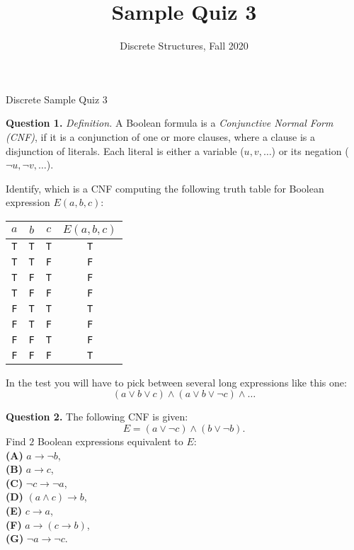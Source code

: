 \documentclass[jou]{apa6}
\title{Sample Quiz 3}
\author{Discrete Structures, Fall 2020}
\affiliation{RBS}
\begin{document}
\thispagestyle{empty}

\twocolumn
{\Large Discrete Sample Quiz 3}

\vspace{6pt}
{\bf Question 1.} {\em Definition.} A Boolean formula is a 
{\em Conjunctive Normal Form (CNF)}, 
if it is a conjunction of one or more clauses, 
where a clause is a disjunction of literals. Each literal 
is either a variable ($u,v,\ldots$) or its negation ($\neg u, \neg v, \ldots$). 

Identify, which is a CNF computing the following truth table for Boolean 
expression $E(a,b,c)$:\\
\begin{tabular}{ c | c | c | c }
$a$ & $b$ & $c$ & $E(a,b,c)$  \\ \hline
{\tt T} & {\tt T} & {\tt T} & {\tt T} \\ \hline
{\tt T} & {\tt T} & {\tt F} & {\tt F} \\ \hline
{\tt T} & {\tt F} & {\tt T} & {\tt F} \\ \hline
{\tt T} & {\tt F} & {\tt F} & {\tt F} \\ \hline
{\tt F} & {\tt T} & {\tt T} & {\tt T} \\ \hline
{\tt F} & {\tt T} & {\tt F} & {\tt F} \\ \hline
{\tt F} & {\tt F} & {\tt T} & {\tt F} \\ \hline
{\tt F} & {\tt F} & {\tt F} & {\tt T} \\ \hline
\end{tabular}

\noindent
In the test you will have to pick between several long expressions like this one:
$$(a \vee b \vee c) \wedge (a \vee b \vee \neg c) \wedge \ldots$$



\vspace{6pt}
{\bf Question 2.} The following CNF is given:
$$E = (a \vee \neg c) \wedge (b \vee \neg b).$$
Find $2$ Boolean expressions equivalent to $E$:\\
{\bf (A)} $a \rightarrow \neg b$,\\
{\bf (B)} $a \rightarrow c$,\\
{\bf (C)} $\neg c \rightarrow \neg a$,\\
{\bf (D)} $(a \wedge c) \rightarrow b$,\\
{\bf (E)} $c \rightarrow a$,\\
{\bf (F)} $a \rightarrow (c \rightarrow b)$,\\
{\bf (G)} $\neg a \rightarrow \neg c$.
\end{document}
